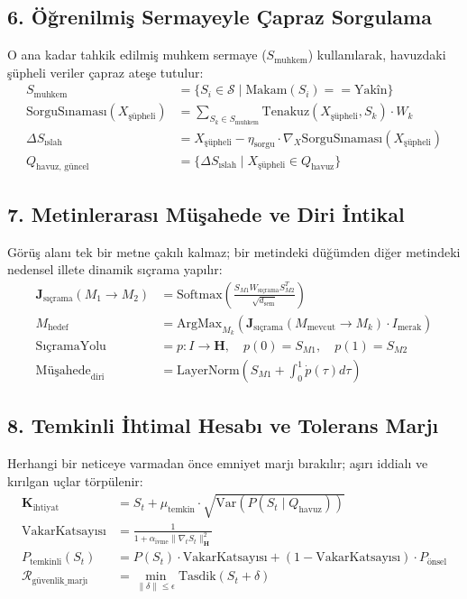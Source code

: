\documentclass[11pt, a4paper]{article}
\begin{document}
\subsection{6. Öğrenilmiş Sermayeyle Çapraz Sorgulama}
O ana kadar tahkik edilmiş muhkem sermaye ($S_{\text{muhkem}}$) kullanılarak, havuzdaki şüpheli veriler çapraz ateşe tutulur:
\begin{align}
S_{\text{muhkem}} &= \{ S_i \in \mathcal{S} \mid \text{Makam}(S_i) == \text{Yakîn} \} \\
\text{SorguSınaması}(X_{\text{şüpheli}}) &= \sum_{S_k \in S_{\text{muhkem}}} \text{Tenakuz}\left( X_{\text{şüpheli}}, S_k \right) \cdot W_k \\
\Delta S_{\text{ıslah}} &= X_{\text{şüpheli}} - \eta_{\text{sorgu}} \cdot \nabla_{X} \text{SorguSınaması}(X_{\text{şüpheli}}) \\
Q_{\text{havuz, güncel}} &= \{ \Delta S_{\text{ıslah}} \mid X_{\text{şüpheli}} \in Q_{\text{havuz}} \}
\end{align}

\subsection{7. Metinlerarası Müşahede ve Diri İntikal}
Görüş alanı tek bir metne çakılı kalmaz; bir metindeki düğümden diğer metindeki nedensel illete dinamik sıçrama yapılır:
\begin{align}
\mathbf{J}_{\text{sıçrama}}(M_1 \to M_2) &= \text{Softmax}\left( \frac{S_{M1} W_{\text{sıçrama}} S_{M2}^T}{\sqrt{d_{\text{sem}}}} \right) \\
M_{\text{hedef}} &= \text{ArgMax}_{M_k} \left( \mathbf{J}_{\text{sıçrama}}(M_{\text{mevcut}} \to M_k) \cdot I_{\text{merak}} \right) \\
\text{SıçramaYolu} &= p : I \to \mathbf{H}, \quad p(0) = S_{M1}, \quad p(1) = S_{M2} \\
\text{Müşahede}_{\text{diri}} &= \text{LayerNorm}\left( S_{M1} + \int_0^1 \dot{p}(\tau) d\tau \right)
\end{align}

\subsection{8. Temkinli İhtimal Hesabı ve Tolerans Marjı}
Herhangi bir neticeye varmadan önce emniyet marjı bırakılır; aşırı iddialı ve kırılgan uçlar törpülenir:
\begin{align}
\mathbf{K}_{\text{ihtiyat}} &= S_t + \mu_{\text{temkin}} \cdot \sqrt{\text{Var}(P(S_t \mid Q_{\text{havuz}}))} \\
\text{VakarKatsayısı} &= \frac{1}{1 + \alpha_{\text{ivme}} \|\nabla_t S_t\|_{\mathbf{H}}^2} \\
P_{\text{temkinli}}(S_t) &= P(S_t) \cdot \text{VakarKatsayısı} + (1 - \text{VakarKatsayısı}) \cdot P_{\text{önsel}} \\
\mathcal{R}_{\text{güvenlik\_marjı}} &= \min_{\|\delta\| \le \epsilon} \text{Tasdik}(S_t + \delta)
\end{align}
\end{document}

